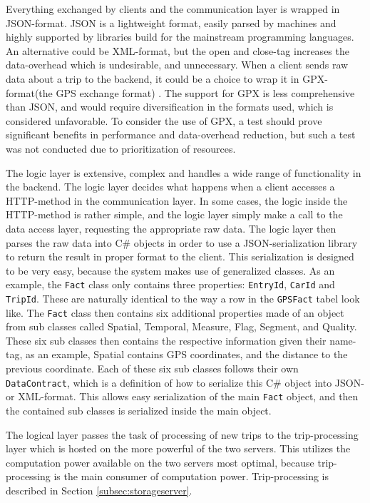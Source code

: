 Everything exchanged by clients and the communication layer is wrapped in JSON-format. JSON is a lightweight format, easily parsed by machines and highly supported by libraries build for the mainstream programming languages. An alternative could be XML-format, but the open and close-tag increases the data-overhead which is undesirable, and unnecessary. When a client sends raw data about a trip to the backend, it could be a choice to wrap it in GPX-format(the GPS exchange format) \citep{GPX_format}. The support for GPX is less comprehensive than JSON, and would require diversification in the formats used, which is considered unfavorable. To consider the use of GPX, a test should prove significant benefits in performance and data-overhead reduction, but such a test was not conducted due to prioritization of resources. 

The logic layer is extensive, complex and handles a wide range of functionality in the backend. The logic layer decides what happens when a client accesses a HTTP-method in the communication layer. In some cases, the logic inside the HTTP-method is rather simple, and the logic layer simply make a call to the data access layer, requesting the appropriate raw data. The logic layer then parses the raw data into C\# objects in order to use a JSON-serialization library to return the result in proper format to the client. This serialization is designed to be very easy, because the system makes use of generalized classes. As an example, the \texttt{Fact} class  only contains three properties: \texttt{EntryId}, \texttt{CarId} and \texttt{TripId}. These are naturally identical to the way a row in the \texttt{GPSFact} tabel look like. The \texttt{Fact} class then contains six additional properties made of an object from sub classes called Spatial, Temporal, Measure, Flag, Segment, and Quality. These six sub classes then contains the respective information given their name-tag, as an example, Spatial contains GPS coordinates, and the distance to the previous coordinate. Each of these six sub classes follows their own \texttt{DataContract}, which is a definition of how to serialize this C\# object into JSON- or XML-format. This allows easy serialization of the main \texttt{Fact} object, and then the contained sub classes is serialized inside the main object.

The logical layer passes the task of processing of new trips to the trip-processing layer which is hosted on the more powerful of the two servers. This utilizes the computation power available on the two servers most optimal, because trip-processing is the main consumer of computation power. Trip-processing is described in Section \ref{subsec:storageserver}. 

